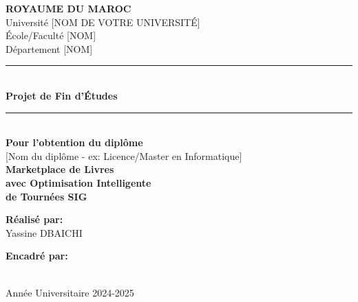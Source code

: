 \documentclass[12pt,a4paper]{report}
\begin{document}

\begin{titlepage}
    \centering

    \vspace*{1cm}

    {\Large \textbf{ROYAUME DU MAROC}}\\[0.3cm]
    {\large Université [NOM DE VOTRE UNIVERSITÉ]}\\[0.2cm]
    {\large École/Faculté [NOM]}\\[0.2cm]
    {\large Département [NOM]}\\[2cm]

    \rule{\linewidth}{0.5mm}\\[0.4cm]
    {\huge \textbf{Projet de Fin d'Études}}\\[0.2cm]
    \rule{\linewidth}{0.5mm}\\[1cm]

    {\Large \textbf{Pour l'obtention du diplôme}}\\[0.3cm]
    {\large [Nom du diplôme - ex: Licence/Master en Informatique]}\\[2cm]

    {\Huge \textbf{Marketplace de Livres}}\\[0.3cm]
    {\Huge \textbf{avec Optimisation Intelligente}}\\[0.3cm]
    {\Huge \textbf{de Tournées SIG}}\\[2cm]

    \begin{minipage}{0.4\textwidth}
        \begin{flushleft}
            \textbf{Réalisé par:}\\
            Yassine DBAICHI
        \end{flushleft}
    \end{minipage}
    \hfill
    \begin{minipage}{0.4\textwidth}
        \begin{flushright}
            \textbf{Encadré par:}\\
            [Nom de l'encadrant]\\
            [Titre/Fonction]
        \end{flushright}
    \end{minipage}

    \vfill

    {\large Année Universitaire 2024-2025}

\end{titlepage}
\end{document}
